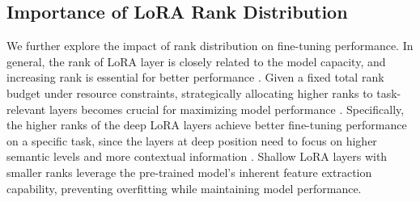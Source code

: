 \subsection{Importance of LoRA Rank Distribution}
\label{lora-distribution}
We further explore the impact of rank distribution on fine-tuning performance. 
In general, the rank of LoRA layer is closely related to the model capacity, and increasing rank is essential for better performance \cite{song2024increasing, shuttleworth2024lora}. 
Given a fixed total rank budget under resource constraints, strategically allocating higher ranks to task-relevant layers becomes crucial for maximizing model performance \cite{zhang2022adaptive, cho2023heterogeneous}.
Specifically, the higher ranks of the deep LoRA layers achieve better fine-tuning performance on a specific task, since the layers at deep position need to focus on higher semantic levels and more contextual information \cite{lin2021fednlp, ma2022layer, liu2023yoga, gao2024higher}. 
Shallow LoRA layers with smaller ranks leverage the pre-trained model's inherent feature extraction capability, preventing overfitting while maintaining model performance. 


